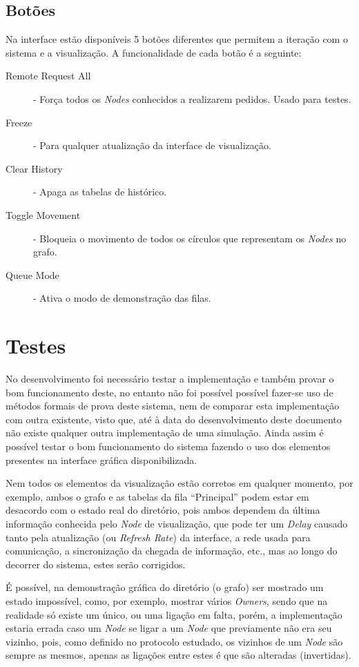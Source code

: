 \subsection*{Botões}
Na interface estão disponíveis 5 botões diferentes que permitem a iteração com o sistema e a visualização. A funcionalidade de cada botão é a seguinte:
\begin{description}
    \item [Remote Request All] - Força todos os \emph{Nodes} conhecidos a realizarem pedidos. Usado para testes.
    \item [Freeze] - Para qualquer atualização da interface de visualização.
    \item [Clear History] - Apaga as tabelas de histórico.
    \item [Toggle Movement] - Bloqueia o movimento de todos os círculos que representam os \emph{Nodes} no grafo.
    \item [Queue Mode] - Ativa o modo de demonstração das filas.

\end{description}

\section{Testes}
No desenvolvimento foi necessário testar a implementação e também provar o bom funcionamento deste, no entanto não foi possível possível fazer-se uso de métodos formais de prova deste sistema, nem de comparar esta implementação com outra existente, visto que, até à data do desenvolvimento deste documento não existe qualquer outra implementação de uma simulação.
Ainda assim é possível testar o bom funcionamento do sistema fazendo o uso dos elementos presentes na interface gráfica disponibilizada.

Nem todos os elementos da visualização estão corretos em qualquer momento, por exemplo, ambos o grafo e as tabelas da fila ``Principal'' podem estar em desacordo com o estado real do diretório, pois ambos dependem da última informação conhecida pelo \emph{Node} de visualização, que pode ter um \emph{Delay} causado tanto pela atualização (ou \emph{Refresh Rate}) da interface, a rede usada para comunicação, a sincronização da chegada de informação, etc., mas ao longo do decorrer do sistema, estes serão corrigidos.


É possível, na demonstração gráfica do diretório (o grafo) ser mostrado um estado impossível, como, por exemplo, mostrar vários \emph{Owners}, sendo que na realidade só existe um único, ou uma ligação em falta, porém, a implementação estaria errada caso um \emph{Node} se ligar a um \emph{Node} que previamente não era seu vizinho, pois, como definido no protocolo estudado, os vizinhos de um \emph{Node} são sempre as mesmos, apenas as ligações entre estes é que são alteradas (invertidas).

